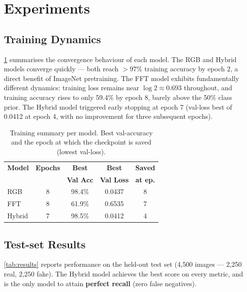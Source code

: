 \section{Experiments}
\label{sec:experiments}

\subsection{Training Dynamics}

\cref{tab:train_summary} summarises the convergence behaviour of each model.
The RGB and Hybrid models converge quickly — both reach $>97\%$ training
accuracy by epoch 2, a direct benefit of ImageNet pretraining.
The FFT model exhibits fundamentally different dynamics: training loss
remains near $\log 2 \approx 0.693$ throughout, and training accuracy
rises to only 59.4\% by epoch 8, barely above the 50\% class prior.
The Hybrid model triggered early stopping at epoch 7 (val-loss best of
0.0412 at epoch 4, with no improvement for three subsequent epochs).

\begin{table}[t]
  \centering
  \caption{Training summary per model.  Best val-accuracy and the epoch at
    which the checkpoint is saved (lowest val-loss).}
  \label{tab:train_summary}
  \small
  \begin{tabular}{@{}lcccc@{}}
    \toprule
    \textbf{Model} & \textbf{Epochs} & \textbf{Best} & \textbf{Best} &
      \textbf{Saved} \\
                   &                 & \textbf{Val Acc} & \textbf{Val Loss} &
      \textbf{at ep.} \\
    \midrule
    RGB    & 8 & 98.4\% & 0.0437 & 8 \\
    FFT    & 8 & 61.9\% & 0.6535 & 7 \\
    Hybrid & 7 & 98.5\% & 0.0412 & 4 \\
    \bottomrule
  \end{tabular}
\end{table}

\subsection{Test-set Results}

\cref{tab:results} reports performance on the held-out test set
(4{,}500 images — 2{,}250 real, 2{,}250 fake).
The Hybrid model achieves the best score on every metric, and is the only
model to attain \textbf{perfect recall} (zero false negatives).

